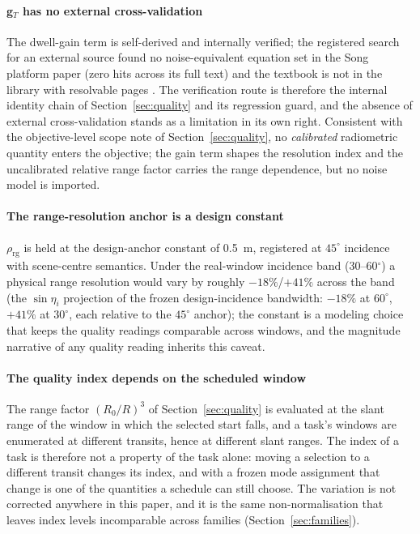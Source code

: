 \documentclass[preprint,authoryear]{elsarticle}
\begin{document}
\paragraph{g$_T$ has no external cross-validation} The dwell-gain term is self-derived and internally verified; the registered search for an external source found no noise-equivalent equation set in the Song platform paper (zero hits across its full text) and the textbook is not in the library with resolvable pages \citep{song2025spaceborne,cumming2005digital}. The verification route is therefore the internal identity chain of Section~\ref{sec:quality} and its regression guard, and the absence of external cross-validation stands as a limitation in its own right. Consistent with the objective-level scope note of Section~\ref{sec:quality}, no \emph{calibrated} radiometric quantity enters the objective; the gain term shapes the resolution index and the uncalibrated relative range factor carries the range dependence, but no noise model is imported.

\paragraph{The range-resolution anchor is a design constant} $\rho_{\mathrm{rg}}$ is held at the design-anchor constant of 0.5~m, registered at $45^{\circ}$ incidence with scene-centre semantics. Under the real-window incidence band (30--60$^{\circ}$) a physical range resolution would vary by roughly $-18\%$/$+41\%$ across the band (the $\sin\eta_i$ projection of the frozen design-incidence bandwidth: $-18\%$ at $60^{\circ}$, $+41\%$ at $30^{\circ}$, each relative to the $45^{\circ}$ anchor); the constant is a modeling choice that keeps the quality readings comparable across windows, and the magnitude narrative of any quality reading inherits this caveat.

\paragraph{The quality index depends on the scheduled window} The range factor $(R_0/R)^3$ of Section~\ref{sec:quality} is evaluated at the slant range of the window in which the selected start falls, and a task's windows are enumerated at different transits, hence at different slant ranges. The index of a task is therefore not a property of the task alone: moving a selection to a different transit changes its index, and with a frozen mode assignment that change is one of the quantities a schedule can still choose. The variation is not corrected anywhere in this paper, and it is the same non-normalisation that leaves index levels incomparable across families (Section~\ref{sec:families}).
\end{document}
